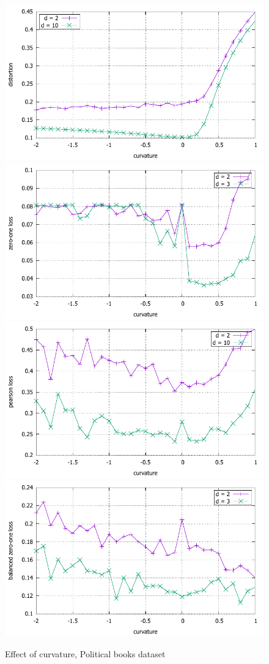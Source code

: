 \documentclass{article} %
\begin{document}
\begin{figure}
    \centering
    \includegraphics[width = 0.49 \textwidth]{polbooks_distortion.pdf}
    \includegraphics[width = 0.49 \textwidth]{polbooks_zero_one.pdf}
    \includegraphics[width = 0.49 \textwidth]{polbooks_pearson.pdf}
    \includegraphics[width = 0.49 \textwidth]{polbooks_balanced_zero_one.pdf}
    \caption{Effect of curvature, Political books dataset}
    \label{fig:polbooks}
\end{figure}
\end{document}
